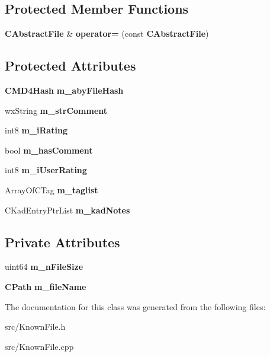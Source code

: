 \subsection*{Protected Member Functions}
\begin{DoxyCompactItemize}
\item 
{\bf CAbstractFile} \& {\bf operator=} (const {\bf CAbstractFile})\label{classCAbstractFile_ab32bcaacf724bdf08c8d33e76703806b}

\end{DoxyCompactItemize}
\subsection*{Protected Attributes}
\begin{DoxyCompactItemize}
\item 
{\bf CMD4Hash} {\bfseries m\_\-abyFileHash}\label{classCAbstractFile_ae82ea14c981656d222c109969fea13e2}

\item 
wxString {\bfseries m\_\-strComment}\label{classCAbstractFile_a6c50f43820d4b57adbac786280c911fb}

\item 
int8 {\bfseries m\_\-iRating}\label{classCAbstractFile_af9c9c56ae43d7c94446b978563c322bc}

\item 
bool {\bfseries m\_\-hasComment}\label{classCAbstractFile_a007c29c30d4940dbeb660f729cbf589d}

\item 
int8 {\bfseries m\_\-iUserRating}\label{classCAbstractFile_a325c7ee61c7c97bba56ba09fad5529ce}

\item 
ArrayOfCTag {\bfseries m\_\-taglist}\label{classCAbstractFile_a2ae4b461029898704e6733836f0949d2}

\item 
CKadEntryPtrList {\bfseries m\_\-kadNotes}\label{classCAbstractFile_af648863dfb6723c68df8cf556c22aea5}

\end{DoxyCompactItemize}
\subsection*{Private Attributes}
\begin{DoxyCompactItemize}
\item 
uint64 {\bfseries m\_\-nFileSize}\label{classCAbstractFile_ae062242d3737cd7f321f855557074e99}

\item 
{\bf CPath} {\bfseries m\_\-fileName}\label{classCAbstractFile_a14da522898407dc2ae042f23b8a30e72}

\end{DoxyCompactItemize}


The documentation for this class was generated from the following files:\begin{DoxyCompactItemize}
\item 
src/KnownFile.h\item 
src/KnownFile.cpp\end{DoxyCompactItemize}
